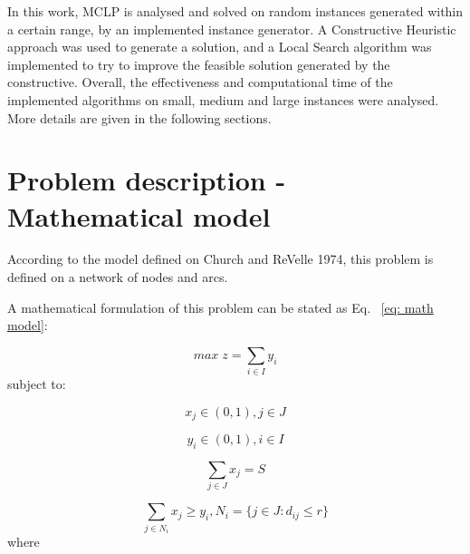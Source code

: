 \documentclass[11pt, a4paper]{article}
\begin{document}
In this work, MCLP is analysed and solved on random instances generated within a certain range, by an implemented instance generator. A Constructive Heuristic approach was used to generate a solution, and a Local Search algorithm was implemented to try to improve the feasible solution generated by the constructive. Overall, the effectiveness and computational time of the implemented algorithms on small, medium and large instances were analysed. More details are given in the following sections.

\section{Problem description - Mathematical model}\label{sec:lit}
According to the model defined on Church and ReVelle 1974, this problem is defined on a network of nodes and arcs. 

A mathematical formulation of this problem can be stated as Eq. ~\ref{eq: math model}:

\begin{equation}\label{eq: math model}
	max \; z = \sum_{i \in I}y_i
\end{equation}
subject to:

\begin{equation}\label{eq: r1}
	x_{j} \in (0,1), j \in J
\end{equation}

\begin{equation}\label{eq: r2}
	y_{i} \in (0,1), i \in I
\end{equation}

\begin{equation}\label{eq: r3}
	\sum_{j \in J}x_j = S
\end{equation}

\begin{equation}\label{eq: r4}
	\sum_{j \in N_i} x_j \geq y_i, N_i = \big\{ j \in J: d_{ij} \leq r \big\}
\end{equation}
where
\end{document}
